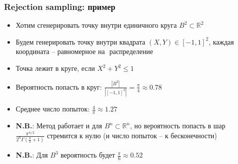 \documentclass[handout,10pt]{beamer}
\begin{document}
\begin{frame}[fragile]
\frametitle{Rejection sampling: пример}
\begin{itemize}
\item Хотим сгенерировать точку внутри единичного круга \begin{math}B^2 \subset \mathbb{R}^2\end{math}
\pause
\item Будем генерировать точку внутри квадрата \begin{math}(X,Y) \in [-1, 1]^2\end{math}, каждая координата -- равномерное на \begin{math}[-1, 1]\end{math} распределение
\pause
\item Точка лежит в круге, если \begin{math}X^2+Y^2\leq 1\end{math}
\pause
\item Вероятность попасть в круг: \begin{math}\frac{|B^2|}{|[-1,1]^2|}=\frac{\pi}{4}\approx 0.78\end{math}
\pause
\item Среднее число попыток: \begin{math}\frac{4}{\pi}\approx 1.27\end{math}
\pause
\item \alert{\textbf{N.B.}}: Метод работает и для \begin{math}B^n\subset \mathbb R^n\end{math}, но вероятность попасть в шар \begin{math}\frac{\pi^{n/2}}{2^n \Gamma(\frac{n}{2}+1)}\end{math} стремится к нулю (и число попыток -- к бесконечности)
\pause
\item \alert{\textbf{N.B.}}: Для \begin{math}B^3\end{math} вероятность будет \begin{math}\frac{\pi}{6}\approx 0.52\end{math}
\end{itemize}
\end{frame}
\end{document}
